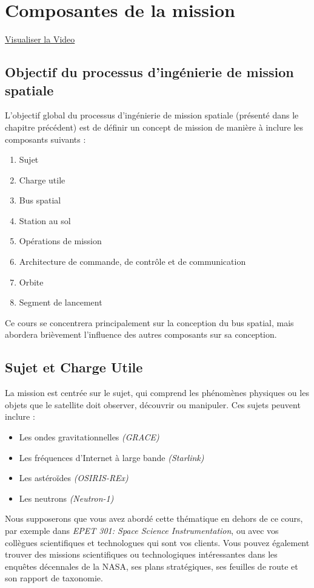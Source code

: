 \section{Composantes de la mission}
\href{https://youtu.be/oWrt5QuPc0M}{Visualiser la Video}
\subsection{Objectif du processus d'ingénierie de mission spatiale}
L'objectif global du processus d'ingénierie de mission spatiale (présenté dans le chapitre précédent) est de définir un concept de mission de manière à inclure les composants suivants :
\begin{enumerate}
    \item Sujet  
    \item Charge utile  
    \item Bus spatial  
    \item Station au sol  
    \item Opérations de mission  
    \item Architecture de commande, de contrôle et de communication  
    \item Orbite  
    \item Segment de lancement  
\end{enumerate}
Ce cours se concentrera principalement sur la conception du bus spatial, mais abordera brièvement l'influence des autres composants sur sa conception.
\subsection{Sujet et Charge Utile}
La mission est centrée sur le sujet, qui comprend les phénomènes physiques ou les objets que le satellite doit observer, découvrir ou manipuler. Ces sujets peuvent inclure :
\begin{itemize}
    \item Les ondes gravitationnelles \textit{(GRACE)}
    \item Les fréquences d'Internet à large bande \textit{(Starlink)}
    \item Les astéroïdes \textit{(OSIRIS-REx)}
    \item Les neutrons \textit{(Neutron-1)}
\end{itemize}
Nous supposerons que vous avez abordé cette thématique en dehors de ce cours, par exemple dans \textit{EPET 301: Space Science Instrumentation}, ou avec vos collègues scientifiques et technologues qui sont vos clients. Vous pouvez également trouver des missions scientifiques ou technologiques intéressantes dans les enquêtes décennales de la NASA, ses plans stratégiques, ses feuilles de route et son rapport de taxonomie.

